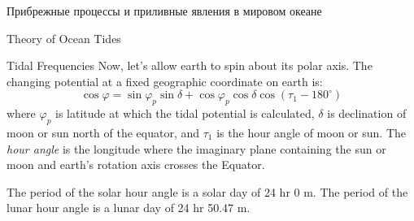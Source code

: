 \begin{chapter}{Прибрежные процессы и приливные явления в мировом океане}
\begin{section}{Theory of Ocean Tides}
\begin{paragraph}{Tidal Frequencies}
 Now, let's allow earth to spin about its
polar axis. The changing potential at a fixed geographic coordinate on
earth is:
\begin{equation}
\cos \varphi = \sin \varphi _p \sin \delta + \cos \varphi _p \cos \delta \cos (\tau
_{1} - 180^{\circ})
\end{equation}
where $\varphi _p$ is latitude at which the tidal potential is
calculated, $\delta $ is declination of moon or sun north
of the equator, and $\tau _{1}$ is the hour angle of moon or sun. The
\textit{hour angle} 
 is the longitude where the
imaginary plane containing the sun or moon and earth's rotation axis
crosses the Equator.
%

The period of the solar hour angle is a solar day of 24 hr 0 m. The
period of the lunar hour angle is a lunar day of 24 hr 50.47 m.
%


\end{paragraph}
\end{section}
\end{chapter}

